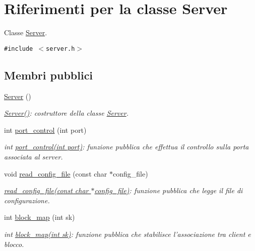 \hypertarget{classServer}{
\section{Riferimenti per la classe Server}
\label{classServer}
}
Classe \hyperlink{classServer}{Server}.  


{\tt \#include $<$server.h$>$}

\subsection*{Membri pubblici}
\begin{CompactItemize}
\item 
\hyperlink{classServer_d5ec9462b520e59f7ea831e157ee5e59_d5ec9462b520e59f7ea831e157ee5e59}{Server} ()
\begin{CompactList}\small\item\em \hyperlink{classServer_d5ec9462b520e59f7ea831e157ee5e59_d5ec9462b520e59f7ea831e157ee5e59}{Server()}: costruttore della classe \hyperlink{classServer}{Server}. \item\end{CompactList}\item 
int \hyperlink{classServer_0abf0fde7783184afc435549217006b3_0abf0fde7783184afc435549217006b3}{port\_\-control} (int port)
\begin{CompactList}\small\item\em int \hyperlink{classServer_0abf0fde7783184afc435549217006b3_0abf0fde7783184afc435549217006b3}{port\_\-control(int port)}: funzione pubblica che effettua il controllo sulla porta associata al server. \item\end{CompactList}\item 
void \hyperlink{classServer_9e4fb38f735a2cbc9dcef29fbe8b18a6_9e4fb38f735a2cbc9dcef29fbe8b18a6}{read\_\-config\_\-file} (const char $\ast$config\_\-file)
\begin{CompactList}\small\item\em \hyperlink{classServer_9e4fb38f735a2cbc9dcef29fbe8b18a6_9e4fb38f735a2cbc9dcef29fbe8b18a6}{read\_\-config\_\-file(const char $\ast$config\_\-file)}: funzione pubblica che legge il file di configurazione. \item\end{CompactList}\item 
int \hyperlink{classServer_0ecc5509a88df842b30d31097a20d000_0ecc5509a88df842b30d31097a20d000}{block\_\-map} (int sk)
\begin{CompactList}\small\item\em int \hyperlink{classServer_0ecc5509a88df842b30d31097a20d000_0ecc5509a88df842b30d31097a20d000}{block\_\-map(int sk)}: funzione pubblica che stabilisce l'associazione tra client e blocco. \item\end{CompactList}\item 

\end{CompactItemize}
